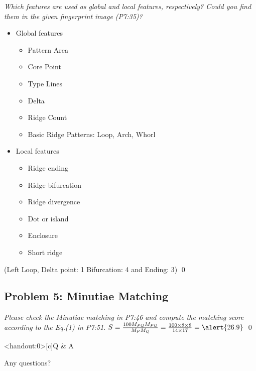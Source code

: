 \documentclass[
        ]{beamer}
\begin{document}
    		\begin{frame}[t]{\subsecname}
    			\begin{overprint}
    			\emph{Which features are used as global and local features, respectively? Could you find them in the given fingerprint image (P7:35)?}
    				\onslide<2>
    				\begin{itemize}
    				\item Global features  				
    					\begin{itemize}
    					\item Pattern Area
    					\item Core Point
    					\item Type Lines
    					\item Delta
    					\item Ridge Count
    					\item Basic Ridge Patterns: Loop, Arch, Whorl
    					\end{itemize}		
    				\item Local features  				
    					\begin{itemize}
    					\item Ridge ending
    					\item Ridge bifurcation
    					\item Ridge divergence
    					\item Dot or island
    					\item Enclosure
    					\item Short ridge
    					\end{itemize}	
    				\end{itemize}							
    				
    				\alert{(Left Loop, Delta point: 1\; Bifurcation: 4 and Ending: 3)}							\qed		
    			\end{overprint}
    		\end{frame}

    \subsection{Problem 5: Minutiae Matching}
    
    		\begin{frame}[t]{\subsecname}
    			\begin{overprint}
    			\onslide<1>
    			\emph{Please check the Minutiae matching in P7:46 and compute the matching score according to the Eq.(1) in P7:51.}
    			\onslide<2> \inpdfc{7}{51} %
    				\onslide<3> \inpdfc{7}{46} %
    				$S=\frac{100 M_{PQ} M_{PQ}}{M_P M_Q}=\frac{100\times 8 \times 8}{14\times 17}=\alert{26.9}$							\qed		
    			\end{overprint}
    		\end{frame}
    


    \begin{frame}<handout:0>[c]{Q \& A}
        \centerline{\Large{Any questions?}}
    \end{frame}
    
    
    
\end{document}
